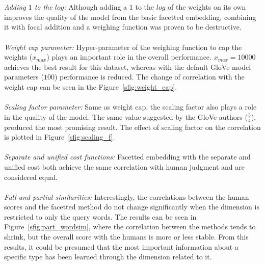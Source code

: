  \\
 \\
\emph{Adding $1$ to the $log$:} Although adding a $1$ to the $log$ of the weights on its own improves the quality of the model from the basic facetted embedding, combining it with focal addition and a weighing function was proven to be destructive.\\
\\
\emph{Weight cap parameter:} Hyper-parameter of the weighing function to cap the weights ($x_{max}$) plays an important role in the overall performance. $x_{max}=10000$ achieves the best result for this dataset, whereas with the default GloVe model parameters ($100$) performance is reduced. The change of correlation with the weight cap can be seen in the Figure~\ref{sfig:weight_cap}.\\
\\
\emph{Scaling factor parameter:} Same as weight cap, the scaling factor also plays a role in the quality of the model. The same value suggested by the GloVe authors \big($\frac{3}{4}$\big), produced the most promising result. The effect of scaling factor on the correlation is plotted in Figure~\ref{sfig:scaling_f}.\\
\\
\emph{Separate and unified cost functions:} Facetted embedding with the separate and unified cost both achieve the same correlation with human judgment and are considered equal.\\
\\
\emph{Full and partial similarities:} Interestingly, the correlations between the human scores and the facetted method do not change significantly when the dimension is restricted to only the query words. The results can be seen in Figure~\ref{sfig:part_wordsim}, where the correlation between the methods tends to shrink, but the overall score with the humans is more or less stable. From this results, it could be presumed that the most important information about a specific type has been learned through the dimension related to it. 
\\

